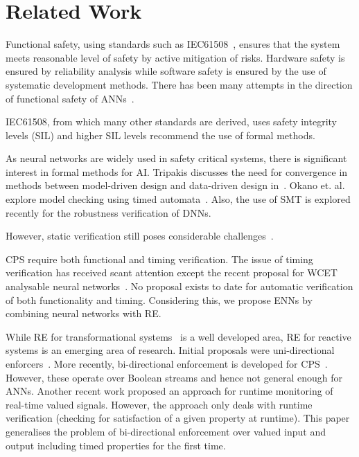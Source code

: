 
\section{Related Work}
Functional safety, using standards such as IEC61508~\cite{iec61508}, ensures that the system meets reasonable level of safety by active mitigation of risks. 
Hardware safety is ensured by reliability analysis while software safety is ensured 
by the use of systematic development methods. There has been many attempts in the direction of functional safety of 
 \acp{ANN}~\cite{functional-safety, scann, SCANNStandard, EstSafeCriteria2003, ANNDevModel1999, ANN-test}. 
IEC61508, from which many other standards are 
derived, uses safety integrity levels (SIL) and higher SIL levels recommend the use of formal methods.

As neural networks are widely used in safety critical systems, there is significant interest in formal methods for AI. Tripakis discusses
the need for convergence in methods between model-driven design and data-driven design in~\cite{tripakis2018data}. 
Okano et. al. explore model checking using timed automata~\cite{timed-enf-autonomous}. Also, the use of \acf{SMT} is explored recently for the 
robustness verification of \acp{DNN}\cite{Gehr2018AI2SA,reluplex}.
However, static verification still poses considerable challenges~\cite{seshia2016towards}.

\ac{CPS} require both functional and timing verification. The issue of timing verification has received scant attention except 
the recent proposal for \ac{WCET} analysable neural networks~\cite{sann}. No proposal exists to date for automatic verification 
of both functionality and timing. Considering this, we  propose \acp{ENN} by combining neural networks with \acf{RE}. 

While \ac{RE} for transformational systems~\cite{theoryRE} is 
a well developed area, \ac{RE} for reactive systems is an emerging area of research. Initial proposals were uni-directional enforcers~\cite{bloem2015shield}. 
More recently, bi-directional enforcement is developed for CPS~\cite{theoryRE}.
However, these operate over Boolean streams and hence not general enough for \acp{ANN}. 
Another recent work \cite{Leucker:2018} proposed an approach for runtime monitoring of real-time valued signals. 
However, the approach only deals with runtime verification (checking for satisfaction of a given property at runtime).
This paper generalises the problem of bi-directional enforcement over 
valued input and output including timed properties for the first time.



